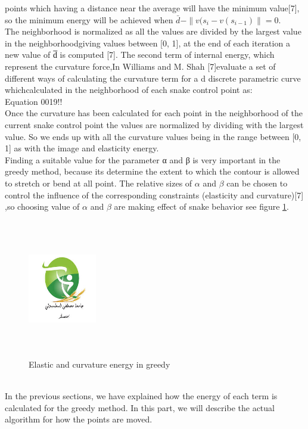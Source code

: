 points which having a distance near the average will have the minimum
value[7], so the minimum energy will be achieved when $\bar{d} - \| v(s_{i} - v(s_{i-1}) \| = 0$.\\
The neighborhood is normalized as all the values are divided by the largest
value in the neighborhoodgiving values between [0, 1], at the end of each
iteration a new value of d̅ is computed [7].
The second term of internal energy, which represent the curvature force,In
Williams and M. Shah [7]evaluate a set of different ways of calculating the
curvature term for a d discrete parametric curve whichcalculated in the
neighborhood of each snake control point as:\\
Equation 0019!!\\
Once the curvature has been calculated for each point in the neighborhood of
the current snake control point the values are normalized by dividing
with the largest value. So we ends up with all the curvature values being in
the range between [0, 1] as with the image and elasticity energy.\\
Finding a suitable value for the parameter α and β is very important in the
greedy method, because its determine the extent to which the contour is
allowed to stretch or bend at all point. The relative sizes of $\alpha$ and $\beta$ can be
chosen to control the influence of the corresponding constraints (elasticity and
curvature)[7] ,so choosing value of $\alpha$ and $\beta$ are making effect of snake
behavior see figure \ref{fig:mesh1}.
\begin{figure}[h]
        \centering
        \includegraphics[width=3cm, height=6cm]{figurs/logouniv.jpeg}
        \caption{Elastic and curvature energy in greedy}
         \label{fig:mesh1}

\end{figure}\\
In the previous sections, we have explained how the energy of each term is
calculated for the greedy method. In this part, we will describe the actual
algorithm for how the points are moved.
